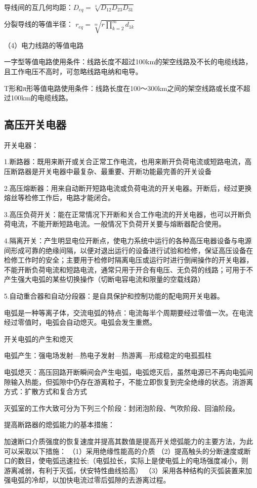 \documentclass[UTF8, 12pt, a4paper]{ctexart}
\begin{document}
导线间的互几何均距：$D _ { eq } = \sqrt [ 3 ] { D _ { 12 } D _ { 23 } D _ { 31 } } $\quad 

分裂导线的等值半径： $r _ { e q } =  \sqrt[m]{ r \prod _ { k = 2 } ^ {m} d _ { 1k } } $

（4）电力线路的等值电路

一字型等值电路使用条件：线路长度不超过100km的架空线路及不长的电缆线路，且工作电压不高时，可忽略线路电纳和电导。

T形和π形等值电路使用条件：线路长度在100～300km之间的架空线路或长度不超过100km的电缆线路。
\subsection{高压开关电器}
开关电器：

1.断路器：既用来断开或关合正常工作电流，也用来断开负荷电流或短路电流，高压断路器是开关电器中最复杂、最重要、开断功能最完善的开关设备

2.高压熔断器：用来自动断开短路电流或负荷电流的开关电器。开断后，经过更换熔丝等检修工作后，电路才能闭合。

3.高压负荷开关：能在正常情况下开断和关合工作电流的开关电器，也可以开断负荷电流，不能开断短路电流。一般情况下负荷开关要与熔断器配合使用。

4.隔离开关：产生明显电位开断点，使电力系统中运行的各种高压电器设备与电源间形成可靠的绝缘间隔，以便对退出运行的设备进行试验和检修，保证高压设备在检修工作时的安全；主要用于检修时隔离电压或运行时进行倒闸操作的开关电器，不能开断负荷电流和短路电流，通常只用于开合有电压、无负荷的线路；可用于不产生强大电弧的某些切换操作（切断电容电流和限量的空载线路）

5.自动重合器和自动分段器：是自具保护和控制功能的配电网开关电器。

电弧是一种等离子体，交流电弧的特点：电流每半个周期要经过零值一次。在电流经过零值时，电弧会自动熄灭。电弧会发生重燃。

开关电弧的产生和熄灭

电弧产生：强电场发射---热电子发射---热游离---形成稳定的电孤孤柱

电弧熄灭：高压回路开断瞬间会产生电弧，电弧熄灭后，虽然电源已不再向电弧间隙输入热能，但弧隙中仍存在游离粒子，不能立即恢复到完全绝缘的状态。消游离方式：扩散方式和复合方式

灭弧室的工作大致可分为下列三个阶段：封闭泡阶段、气吹阶段、回油阶段。

提高断路器的熄弧能力的基本措施：

加速断口介质强度的恢复速度并提高其数值是提高开关熄弧能力的主要方法，为此可以采取以下措施：
（1）采用绝缘性能高的介质
（2）提高触头的分断速度或断口的数目，使电弧迅速拉长;（电弧拉长，实际上是使电弧上的电场强度减小，则游离减弱，有利于灭弧，伏安特性曲线拾高）
（3）采用各种结构的灭弧装置来加强电弧的冷却，以加快电流过零后弧隙的去游离过程。
\end{document}
